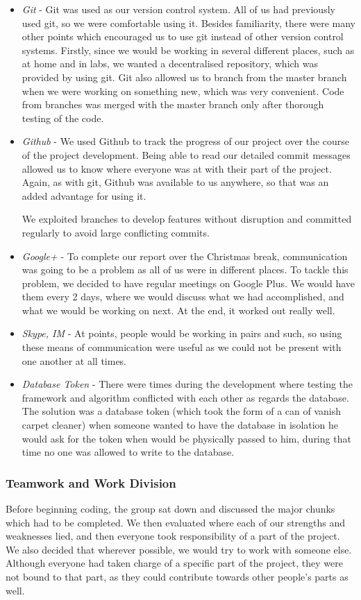 \documentclass[11pt]{article}
\begin{document}
\begin{itemize}
\item 
\emph{Git} - Git was used as our version control system. All of us had previously
used git, so we were comfortable using it. Besides familiarity, there were
many other points which encouraged us to use git instead of other version control
systems. Firstly, since we would be working in several different places, such as
at home and in labs, we wanted a decentralised repository, which was provided
by using git. Git also allowed us to branch from the master branch when we were
working on something new, which was very convenient. Code from branches was
merged with the master branch only after thorough testing of the code.
\item 
\emph{Github} - We used Github to track the progress of our project over the course
of the project development. Being able to read our detailed commit messages
allowed us to know where everyone was at with their part of the project. Again,
as with git, Github was available to us anywhere, so that was an added advantage
for using it.

We exploited branches to develop features without disruption and committed regularly
to avoid large conflicting commits.
\item 
\emph{Google+} - To complete our report over the Christmas break, communication was going
to be a problem as all of us were in different places. To tackle this problem,
we decided to have regular meetings on Google Plus. We would have them every 2
days, where we would discuss what we had accomplished, and what we would be working
on next. At the end, it worked out really well.
\item 
\emph{Skype, IM} - At points, people would be working in pairs and such, so using
these means of communication were useful as we could not be present with one
another at all times.
\item
\emph{Database Token} - There were times during the development where testing the
framework and algorithm conflicted with each other as regards the database. The solution 
was a database token (which took the form of a can of vanish carpet cleaner) when someone
wanted to have the database in isolation he would ask for the token when would be physically
passed to him, during that time no one was allowed to write to the database.

\end{itemize}


\subsubsection{Teamwork and Work Division}
Before beginning coding, the group sat down and discussed the major chunks
which had to be completed. We then evaluated where each of our strengths
and weaknesses lied, and then everyone took responsibility of a part of the
project. We also decided that wherever possible, we would try to work with 
someone else. Although everyone had taken charge of a specific part of the
project, they were not bound to that part, as they could contribute towards
other people's parts as well.
\end{document}
